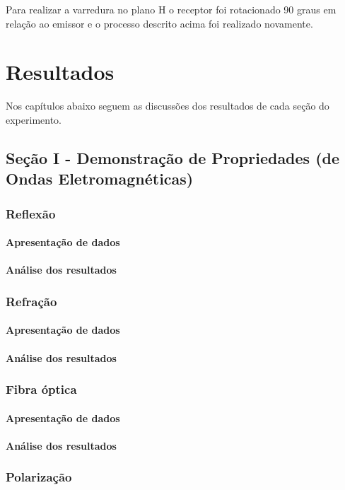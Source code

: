 \documentclass[12pt]{article}
\begin{document}
Para realizar a varredura no plano H o receptor foi rotacionado 90
graus em relação ao emissor e o processo descrito acima foi realizado novamente.

\section{Resultados}
Nos capítulos abaixo seguem as discussões dos resultados de cada
seção do experimento.

\subsection{Seção I - Demonstração de Propriedades (de Ondas Eletromagnéticas)}
\subsubsection{Reflexão}
\paragraph{Apresentação de dados}
\paragraph{Análise dos resultados}

\subsubsection{Refração}
\paragraph{Apresentação de dados}
\paragraph{Análise dos resultados}

\subsubsection{Fibra óptica}
\paragraph{Apresentação de dados}
\paragraph{Análise dos resultados}

\subsubsection{Polarização}
\end{document}
